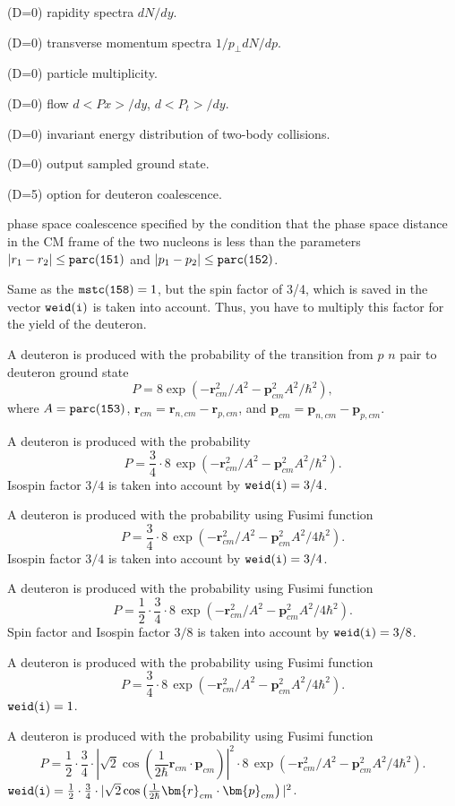 \documentclass[]{article}
\newenvironment{entry}%
{\begin{list}{}{\setlength{\topsep}{0mm} \setlength{\itemsep}{0mm}
\setlength{\parskip}{0mm} \setlength{\parsep}{0mm}
\setlength{\leftmargin}{20mm} \setlength{\rightmargin}{0mm}
\setlength{\labelwidth}{18mm} \setlength{\labelsep}{2mm}}}%
{\end{list}}
\newenvironment{subentry}%
{\begin{list}{}{\setlength{\topsep}{0mm} \setlength{\itemsep}{0mm}
\setlength{\parskip}{0mm} \setlength{\parsep}{0mm}
\setlength{\leftmargin}{10mm} \setlength{\rightmargin}{0mm}
\setlength{\labelwidth}{18mm} \setlength{\labelsep}{2mm}}}%
{\end{list}}
\newcommand{\ttt}[1]{{\tt#1}}
\newcommand{\itemt}[1]{\item[{\tt #1}\hfill]}
\begin{document}
\begin{entry}
\itemt{mstc(152):} (D=0) rapidity spectra $dN/dy$.
\itemt{mstc(153):} (D=0) transverse momentum spectra $1/p_{\perp}dN/dp$.
\itemt{mstc(154):} (D=0) particle multiplicity.
\itemt{mstc(155):} (D=0) flow $d<Px>/dy$, $d<P_t>/dy$.
\itemt{mstc(156):} (D=0) invariant energy distribution of two-body collisions.
\itemt{mstc(157):} (D=0) output sampled ground state.
\itemt{mstc(158):} (D=5) option for deuteron coalescence.
 \begin{subentry}
   \itemt{$=1$ :} phase space coalescence specified by the condition that the
   phase space distance in the CM frame of the two nucleons is less than the parameters 
 $|r_1 - r_2|\leq \ttt{parc(151)}$ and $|p_1 - p_2|\leq \ttt{parc(152)}$.
   \itemt{$=2$ :} Same as the $\ttt{mstc(158)}=1$, but the spin factor of 3/4,
   which is saved in the vector $\ttt{weid(i)}$ is taken into account. Thus, 
   you have to multiply this factor for the yield of the deuteron.
   \itemt{$=3$ :} A deuteron is produced with the probability of the
transition from $p$ $n$ pair to deuteron ground state
     $$P= 8\exp(-\bm{r}_{cm}^2/A^2 -\bm{p}_{cm}^2A^2/\hbar^2),$$
     where $A=\ttt{parc(153)}$, $\bm{r}_{cm}=\bm{r}_{n,cm}-\bm{r}_{p,cm}$, and
     $\bm{p}_{cm}=\bm{p}_{n,cm}-\bm{p}_{p,cm}$.
   \itemt{$=4$ :} A deuteron is produced with the probability 
     $$P= \frac{3}{4}\cdot 8\,\exp(-\bm{r}_{cm}^2/A^2 -\bm{p}_{cm}^2A^2/\hbar^2).$$
     Isospin factor $3/4$ is taken into account by $\ttt{weid(i)}=3/4$.
   \itemt{$=5$ :} A deuteron is produced with the probability using Fusimi function
     $$P= \frac{3}{4}\cdot 8\,\exp(-\bm{r}_{cm}^2/A^2 -\bm{p}_{cm}^2A^2/4\hbar^2).$$
     Isospin factor $3/4$ is taken into account by $\ttt{weid(i)}=3/4$.
   \itemt{$=6$ :} A deuteron is produced with the probability using Fusimi function
     $$P= \frac{1}{2}\cdot\frac{3}{4}\cdot 8\,\exp(-\bm{r}_{cm}^2/A^2 -\bm{p}_{cm}^2A^2/4\hbar^2).$$
     Spin factor and Isospin factor $3/8$ is taken into account by $\ttt{weid(i)}=3/8$.
   \itemt{$=7$ :} A deuteron is produced with the probability using Fusimi function
     $$P= \frac{3}{4}\cdot 8\,\exp(-\bm{r}_{cm}^2/A^2 -\bm{p}_{cm}^2A^2/4\hbar^2).$$
     $\ttt{weid(i)}=1$.
   \itemt{$=8$ :} A deuteron is produced with the probability using Fusimi function
     $$P= \frac{1}{2}\cdot\frac{3}{4}\cdot 
            \left|\sqrt{2}\cos \left(\frac{1}{2\hbar}\bm{r}_{cm}\cdot\bm{p}_{cm} \right)\right|^2
            \cdot 8\,\exp(-\bm{r}_{cm}^2/A^2 -\bm{p}_{cm}^2A^2/4\hbar^2).$$
     $\ttt{weid(i)}=\frac{1}{2}\cdot\frac{3}{4}\cdot 
            |\sqrt{2}\cos \left(\frac{1}{2\hbar}\bm{r}_{cm}\cdot\bm{p}_{cm} \right)|^2
     $.
 \end{subentry}


\end{entry}
\end{document}
